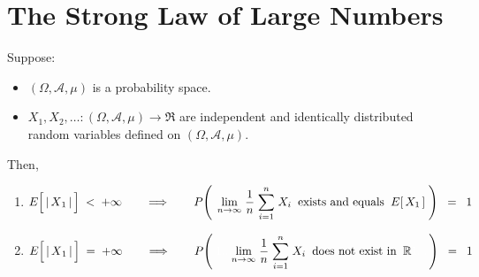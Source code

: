 

\section{The Strong Law of Large Numbers}
\setcounter{theorem}{0}
\setcounter{equation}{0}


\renewcommand{\theenumi}{\roman{enumi}}
\renewcommand{\labelenumi}{\textnormal{(\theenumi)}$\;\;$}


\begin{theorem}
\mbox{}\vskip 0.1cm
\noindent
Suppose:
\begin{itemize}
\item
	$(\Omega,\mathcal{A},\mu)$ is a probability space.
\item
	$X_{1}, X_{2}, \ldots : (\Omega,\mathcal{A},\mu) \longrightarrow \Re$ are
	independent and identically distributed random variables
	defined on $(\Omega,\mathcal{A},\mu)$.
\end{itemize}
Then,
\begin{enumerate}
\item\label{FiniteExpectiationImpliesStrongLaw}
	\begin{equation*}
	E\!\left[\,\vert\,\overset{{\color{white}.}}{X}_{1}\,\vert\,\right] \;<\; +\infty
	\quad\quad\Longrightarrow\quad\quad
	P\!\left(\;\,
		\underset{n\rightarrow\infty}{\lim}\;
		\dfrac{1}{n}\;\overset{n}{\underset{i=1}{\sum}}\;X_{i}
		\;\;\textnormal{exists and equals}\;\;
		E[\,X_{1}\,]
		\;\right)
	\;\; = \;\; 1
	\end{equation*}
\item
	\begin{equation*}
	E\!\left[\,\vert\,\overset{{\color{white}.}}{X}_{1}\,\vert\,\right] \;=\; +\infty
	\quad\quad\Longrightarrow\quad\quad
	P\!\left(\;
		{\color{white}1...}
		\underset{n\rightarrow\infty}{\lim}\;
		\dfrac{1}{n}\;\overset{n}{\underset{i=1}{\sum}}\;X_{i}
		\;\;\textnormal{does not exist in}\;\; \Re
		{\color{white}1...}
		\,\right)
	\;\; = \;\; 1
	\end{equation*}
\end{enumerate}
\end{theorem}
\proof

